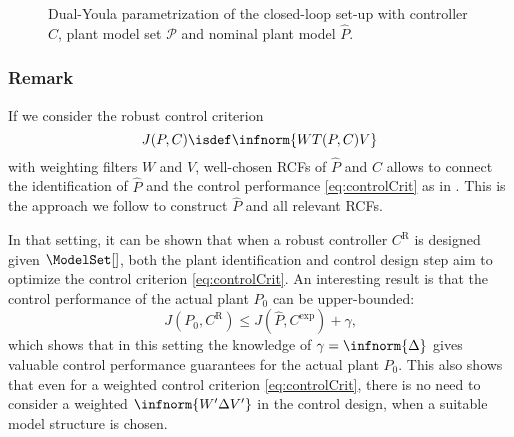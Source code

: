 \begin{figure}
 \centering
 
 \caption{Dual-Youla parametrization of the closed-loop set-up  with controller $C$, plant model set $\mathcal{P}$ and nominal plant model $\hat{P}$.}
 \label{fig:dualYoula}
\end{figure}

\subsubsection{Remark}
If we consider the robust control criterion
\begin{equation}
  J(P,C) \isdef \infnorm{W T(P,C) V}
  \label{eq:controlCrit}
\end{equation}
with weighting filters $W$ and $V$, well-chosen \glspl{RCF} of $\hat{P}$ and $C$ allows to connect the identification of $\hat{P}$ and the control performance \eqref{eq:controlCrit} as in \citep{Oomen2012SIRP}.
This is the approach we follow to construct $\hat{P}$ and all relevant \glspl{RCF}.

In that setting, it can be shown that when a robust controller $C^{\mathrm{R}}$ is designed given $\ModelSet[]$, both the plant identification and control design step aim to optimize the control criterion \eqref{eq:controlCrit}.
An interesting result is that the control performance of the actual plant $P_0$ can be upper-bounded:
\begin{equation}
  J(P_0,C^{\mathrm{R}}) \leq J(\hat{P}, C^{\mathrm{exp}}) + \gamma
  \text{,}
\end{equation}
which shows that in this setting the knowledge of $\gamma = \infnorm{\Delta}$ gives valuable control performance guarantees for the actual plant $P_0$.
This also shows that even for a weighted control criterion \eqref{eq:controlCrit}, there is no need to consider a weighted $\infnorm{W' \Delta V'}$ in the control design, when a suitable model structure is chosen.

